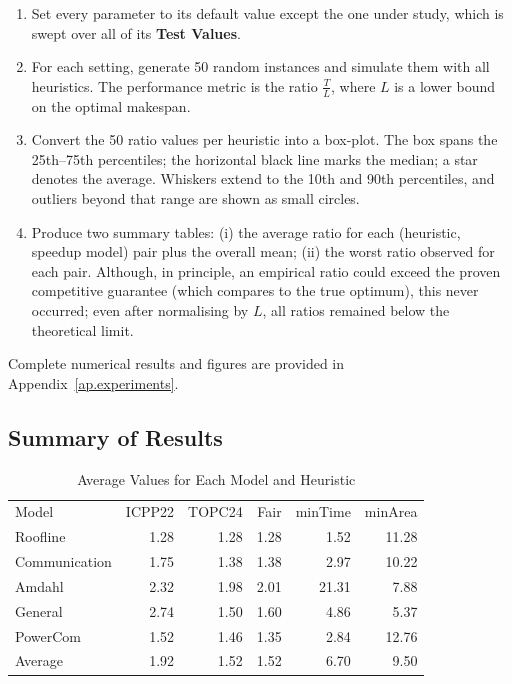 \documentclass{article}
\begin{document}
\begin{enumerate}
    \item Set every parameter to its default value except the one under study,
          which is swept over all of its \textbf{Test Values}.
    \item For each setting, generate 50 random instances and simulate them with
          all heuristics.  
          The performance metric is the ratio \(\tfrac{T}{L}\), where \(L\) is
          a lower bound on the optimal makespan.
    \item Convert the 50 ratio values per heuristic into a box-plot.
          The box spans the 25th–75th percentiles; the horizontal black line
          marks the median; a star denotes the average.
          Whiskers extend to the 10th and 90th percentiles, and outliers
          beyond that range are shown as small circles.
    \item Produce two summary tables:  
          (i) the average ratio for each (heuristic, speedup model)
          pair plus the overall mean;  
          (ii) the worst ratio observed for each pair.
          Although, in principle, an empirical ratio could exceed the proven
          competitive guarantee (which compares to the true optimum), this
          never occurred; even after normalising by \(L\), all ratios remained
          below the theoretical limit.
\end{enumerate}

Complete numerical results and figures are provided in
Appendix~\ref{ap.experiments}.

\subsection{Summary of Results}

\begin{table}[htbp]
\centering
\caption{Average Values for Each Model and Heuristic}
\label{tab:average_values}
\begin{tabular}{lrrrrr}
\toprule
Model & ICPP22 & TOPC24 & Fair & minTime & minArea \\
Roofline & 1.28 & 1.28 & 1.28 & 1.52 & 11.28 \\
Communication & 1.75 & 1.38 & 1.38 & 2.97 & 10.22 \\
Amdahl & 2.32 & 1.98 & 2.01 & 21.31 & 7.88 \\
General & 2.74 & 1.50 & 1.60 & 4.86 & 5.37 \\
PowerCom & 1.52 & 1.46 & 1.35 & 2.84 & 12.76 \\
\midrule
Average & 1.92 & 1.52 & 1.52 & 6.70 & 9.50 \\
\bottomrule
\end{tabular}
\end{table}
\end{document}
